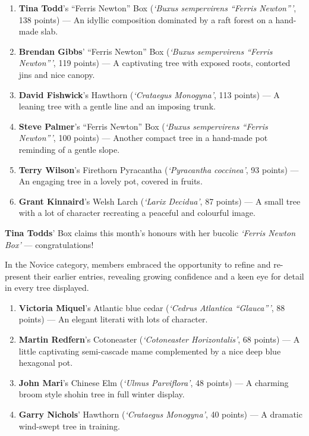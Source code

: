 \begin{enumerate}
    \item \textbf{Tina Todd}'s ``Ferris Newton'' Box (\textit{`Buxus sempervirens ``Ferris Newton'''}, 138 points) --- An idyllic composition dominated by a raft forest on a hand\--made slab.
    \item \textbf{Brendan Gibbs}' ``Ferris Newton'' Box (\textit{`Buxus sempervirens ``Ferris Newton'''}, 119 points) --- A captivating tree with exposed roots, contorted jins and nice canopy.
    \item \textbf{David Fishwick}'s Hawthorn (\textit{`Crataegus Monogyna'}, 113 points) --- A leaning tree with a gentle line and an imposing trunk.
    \item \textbf{Steve Palmer}'s ``Ferris Newton'' Box (\textit{`Buxus sempervirens ``Ferris Newton'''}, 100 points) --- Another compact tree in a hand\--made pot reminding of a gentle slope.
    \item \textbf{Terry Wilson}'s Firethorn Pyracantha (\textit{`Pyracantha coccinea'}, 93 points) --- An engaging tree in a lovely pot, covered in fruits.
    \item \textbf{Grant Kinnaird}'s Welsh Larch (\textit{`Larix Decidua'}, 87 points) --- A small tree with a lot of character recreating a peaceful and colourful image.
\end{enumerate}

\noindent 
\textbf{Tina Todds}' Box claims this month's honours with her bucolic \textit{`Ferris Newton Box'} --- congratulations!

\medskip
{}
\noindent
In the Novice category, members embraced the opportunity to refine and re\--present their earlier entries, revealing growing confidence and a keen eye for detail in every tree displayed.

\begin{enumerate}
    \item \textbf{Victoria Miquel}'s Atlantic blue cedar (\textit{`Cedrus Atlantica ``Glauca'''}, 88 points) --- An elegant literati with lots of character.
    \item \textbf{Martin Redfern}'s Cotoneaster (\textit{`Cotoneaster Horizontalis'}, 68 points) --- A little captivating semi\--cascade mame complemented by a nice deep blue hexagonal pot.
    \item \textbf{John Mari}'s Chinese Elm (\textit{`Ulmus Parviflora'}, 48 points) --- A charming broom style shohin tree in full winter display.
    \item \textbf{Garry Nichols}' Hawthorn (\textit{`Crataegus Monogyna'}, 40 points) --- A dramatic wind\--swept tree in training.
\end{enumerate}

